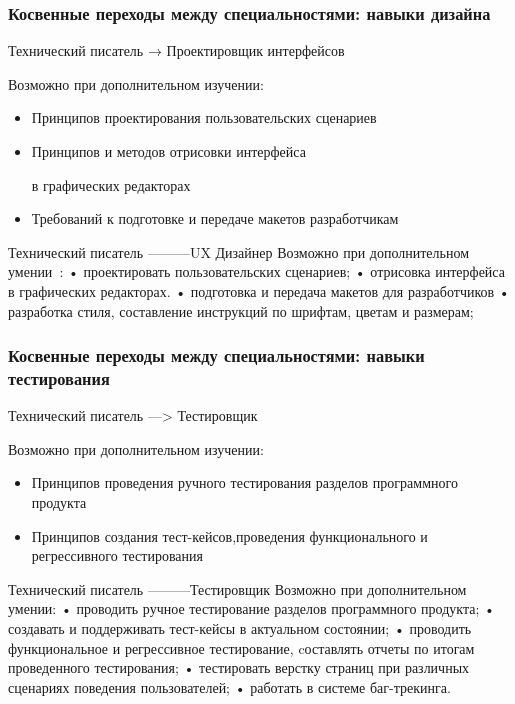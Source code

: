 \documentclass{../industrial-development}
\begin{document}
\begin{frame} \frametitle{Косвенные переходы между специальностями: навыки дизайна }

\begin{block}{Технический писатель → Проектировщик интерфейсов}

Возможно при дополнительном изучении:
  \end{block}
\begin{itemize}
  \item Принципов проектирования пользовательских сценариев
  \item Принципов и методов отрисовки интерфейса 

в графических редакторах
\item Требований к подготовке и передаче макетов разработчикам
  \end{itemize}
\end{frame}

\lecturenotes

Технический писатель ---------UX Дизайнер
Возможно при дополнительном умении~\cite{rab}:
•	проектировать пользовательских сценариев;
•	отрисовка интерфейса в графических редакторах.
•	подготовка и передача макетов для разработчиков
•	разработка стиля, составление инструкций по шрифтам, цветам и размерам;

\begin{frame} \frametitle{Косвенные переходы между специальностями: навыки тестирования}
\begin{block}{Технический писатель ---> Тестировщик}

Возможно при дополнительном изучении:
  \end{block}
\begin{itemize}
  \item Принципов проведения ручного тестирования разделов программного продукта
  \item Принципов создания тест-кейсов,проведения функционального и регрессивного тестирования
  \end{itemize}
\end{frame}

\lecturenotes


Технический писатель ---------Тестировщик
Возможно при дополнительном умении:
•	проводить ручное тестирование разделов программного продукта;
•	создавать и поддерживать тест-кейсы в актуальном состоянии;
•	проводить функциональное и регрессивное тестирование, cоставлять отчеты по итогам проведенного тестирования;
•	тестировать верстку страниц при различных сценариях поведения пользователей;
•	работать в системе баг-трекинга.
\end{document}
